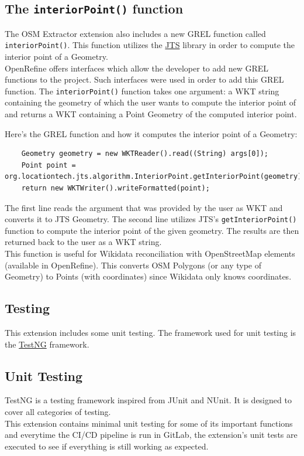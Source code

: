 \subsection{The \texttt{interiorPoint()} function}
The OSM Extractor extension also includes a new GREL function called \texttt{interiorPoint()}. This function
utilizes the \href{https://github.com/locationtech/jts}{JTS} library in order to compute the interior point of a Geometry.\\
\newline
OpenRefine offers interfaces which allow the developer to add new GREL functions to the project. Such interfaces were used in order
to add this GREL function. The \texttt{interiorPoint()} function takes one argument: a WKT string containing the geometry
of which the user wants to compute the interior point of and returns a WKT containing a Point Geometry of the computed interior point.\\
\newline

Here's the GREL function and how it computes the interior point of a Geometry:
\begin{verbatim}
    Geometry geometry = new WKTReader().read((String) args[0]);
    Point point = org.locationtech.jts.algorithm.InteriorPoint.getInteriorPoint(geometry);
    return new WKTWriter().writeFormatted(point);
\end{verbatim}
The first line reads the argument that was provided by the user as WKT and converts it to JTS Geometry.
The second line utilizes JTS's \texttt{getInteriorPoint()} function to compute the interior point of the
given geometry. The results are then returned back to the user as a WKT string.\\
\newline
This function is useful for Wikidata reconciliation with OpenStreetMap elements (available in OpenRefine).
This converts OSM Polygons (or any type of Geometry) to Points (with coordinates) since Wikidata only knows coordinates.
\pagebreak
\subsection{Testing}
This extension includes some unit testing. The framework used for unit testing is the \href{https://testng.org/}{TestNG} framework.
\subsection{Unit Testing}
TestNG is a testing framework inspired from JUnit and NUnit. It is designed to cover all categories of testing.\\
This extension contains minimal unit testing for some of its important functions and everytime the CI/CD pipeline is run in GitLab, the
extension's unit tests are executed to see if everything is still working as expected.
\pagebreak
